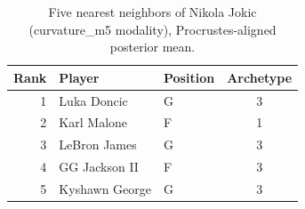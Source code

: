 \begin{table}[htbp]
  \centering\small
  \begin{tabular}{rllc}
    \toprule
    Rank & Player & Position & Archetype \\
    \midrule
    1 & Luka Doncic & G & 3 \\
    2 & Karl Malone & F & 1 \\
    3 & LeBron James & G & 3 \\
    4 & GG Jackson II & F & 3 \\
    5 & Kyshawn George & G & 3 \\
    \bottomrule
  \end{tabular}
  \caption{Five nearest neighbors of Nikola Jokic (curvature_m5 modality), Procrustes-aligned posterior mean.}
  \label{tab:Nikola_Jokic_neighbors_curvature_m5}
\end{table}

